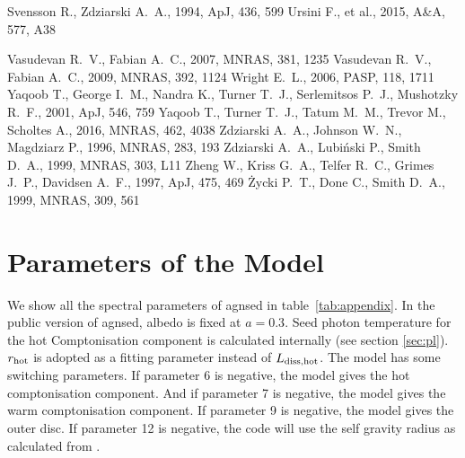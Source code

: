 \documentclass[a4paper,fleqn,usenatbib]{mnras}
\begin{document}
\begin{thebibliography}{99}
 Svensson R., Zdziarski A.~A., 1994, ApJ, 436, 599 
 Ursini F., et al., 2015, A\&A, 577, A38 

 Vasudevan R.~V., Fabian A.~C., 2007, MNRAS, 381, 1235 
 Vasudevan R.~V., Fabian A.~C., 2009, MNRAS, 392, 1124 
 Wright E.~L., 2006, PASP, 118, 1711 
 Yaqoob T., George I.~M., Nandra K., Turner T.~J., Serlemitsos P.~J., Mushotzky R.~F., 2001, ApJ, 546, 759 
 Yaqoob T., Turner T.~J., Tatum M.~M., Trevor M., Scholtes A., 2016, MNRAS, 462, 4038 
 Zdziarski A.~A., Johnson W.~N., Magdziarz P., 1996, MNRAS, 283, 193 
 Zdziarski A.~A., Lubi{\'n}ski P., Smith D.~A., 1999, MNRAS, 303, L11 
 Zheng W., Kriss G.~A., Telfer R.~C., Grimes J.~P., Davidsen A.~F., 1997, ApJ, 475, 469 
 {\.Z}ycki P.~T., Done C., Smith D.~A., 1999, MNRAS, 309, 561 


\end{thebibliography}






\appendix
\section{Parameters of the Model}

We show all the spectral parameters of {\sc agnsed} in table~\ref{tab:appendix}. 
In the public version of {\sc agnsed}, albedo is fixed at $a=0.3$. 
Seed photon temperature for the hot Comptonisation component is calculated 
internally (see section \ref{sec:pl}).
$r_{\rm hot}$ is adopted as a fitting parameter instead of $L_{\rm diss, hot}$.
The model has some switching parameters. 
If  parameter 6 is negative, the model gives  the hot comptonisation component.
And if parameter 7 is negative, the model gives the warm comptonisation component.
If parameter 9 is negative, the model gives the outer disc.
If parameter 12 is negative, the code will use the self gravity radius as calculated from \cite{laor1989}.
\end{document}
